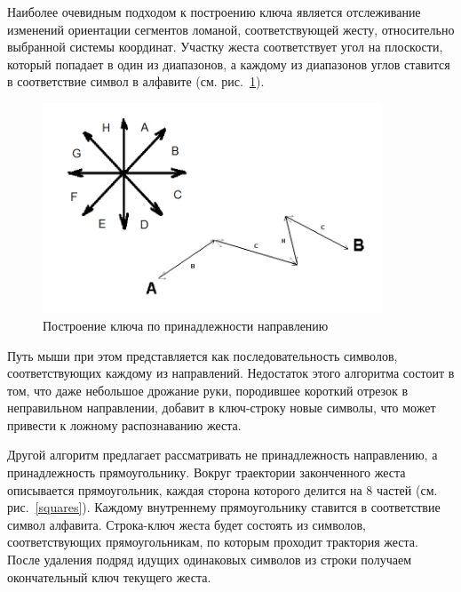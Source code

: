 \documentclass[a5paper]{article}
\begin{document}
Наиболее очевидным подходом к построению ключа является отслеживание изменений ориентации сегментов ломаной, соответствующей жесту, относительно выбранной системы координат. Участку жеста соответствует угол на плоскости, который попадает в один из диапазонов, а каждому из диапазонов углов ставится в соответствие символ в алфавите (см. рис.~\ref{chaos}). 

\begin{figure} [ht]
  \begin{center}
    \includegraphics[width=0.9\textwidth, bb=0 0 804 498]{02-chaos.png}
    \caption{Построение ключа по принадлежности направлению}
    \label{chaos}
  \end{center}
\end{figure}

Путь мыши при этом представляется как последовательность символов, соответствующих каждому из направлений. Недостаток этого алгоритма состоит в том, что даже небольшое дрожание руки, породившее короткий отрезок в неправильном направлении, добавит в ключ-строку новые символы, что может привести к ложному распознаванию жеста.

Другой алгоритм предлагает рассматривать не принадлежность направлению, а принадлежность прямоугольнику. Вокруг траектории законченного жеста описывается прямоугольник, каждая сторона которого делится на 8 частей (см. рис.~\ref{squares}). Каждому внутреннему прямоугольнику ставится в соответствие символ алфавита. Строка-ключ жеста будет состоять из символов, соответствующих прямоугольникам, по которым проходит трактория жеста. После удаления подряд идущих одинаковых символов из строки получаем окончательный ключ текущего жеста. 
\end{document}
